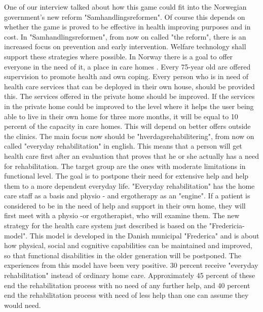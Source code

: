 One of our interview talked about how this game could fit into the Norwegian government’s new reform "Samhandlingsreformen". Of course this depends on whether the game is proved to be effective in health improving purposes and in cost. In "Samhandlingsreformen", from now on called "the reform", there is an increased focus on prevention and early intervention. Welfare technology shall support these strategies where possible. In Norway there is a goal to offer everyone in the need of it, a place in care homes . Every 75-year old are offered supervision to promote health and own coping. Every person who is in need of health care services that can be deployed in their own house, should be provided this. The services offered in the private home should be improved. If the services in the private home could be improved to the level where it helps the user being able to live in their own home for three more months, it will be equal to 10 percent of the capacity in care homes. This will depend on better offers outside the clinics. The main focus now should be "hverdagsrehabilitering", from now on called  "everyday rehabilitation" in english. This means that a person will get health care first after an evaluation that proves that he or she actually has a need for rehabilitation. The target group are the ones with moderate limitations in functional level. The goal is to postpone their need for extensive help and help them to a more dependent everyday life.  "Everyday rehabilitation" has the home care staff as a basis and physio - and ergotherapy as an "engine". If a patient is considered to be in the need of help and support in their own home, they will first meet with a physio -or ergotherapist, who will examine them. The new strategy for the health care system just described is based on the "Fredericia-model". This model is developed in the Danish municipal "Frederica" and is about how physical, social and cognitive capabilities can be maintained and improved, so that functional disabilities in the older generation will be postponed. The experiences from this model have been very positive. 30 percent receive "everyday rehabilitation" instead of ordinary home care. Approximately 45 percent of these end the rehabilitation process with no need of any further help, and 40 percent end the rehabilitation process with need of less help than one can assume they would need.\cite{budsjett} \\ \\
